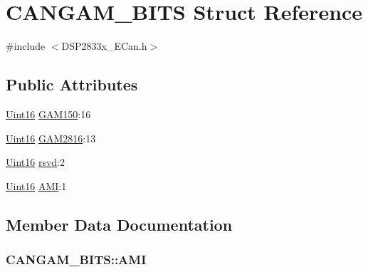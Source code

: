 \hypertarget{struct_c_a_n_g_a_m___b_i_t_s}{}\section{C\+A\+N\+G\+A\+M\+\_\+\+B\+I\+T\+S Struct Reference}
\label{struct_c_a_n_g_a_m___b_i_t_s}


{\ttfamily \#include $<$D\+S\+P2833x\+\_\+\+E\+Can.\+h$>$}

\subsection*{Public Attributes}
\begin{DoxyCompactItemize}
\item 
\hyperlink{_d_s_p2833x___device_8h_a59a9f6be4562c327cbfb4f7e8e18f08b}{Uint16} \hyperlink{struct_c_a_n_g_a_m___b_i_t_s_aa00a0d2413e29f6d399fcca7c89aaf15}{G\+A\+M150}\+:16
\item 
\hyperlink{_d_s_p2833x___device_8h_a59a9f6be4562c327cbfb4f7e8e18f08b}{Uint16} \hyperlink{struct_c_a_n_g_a_m___b_i_t_s_aaa0ef4eff24a2912c463cee73f9bfbc5}{G\+A\+M2816}\+:13
\item 
\hyperlink{_d_s_p2833x___device_8h_a59a9f6be4562c327cbfb4f7e8e18f08b}{Uint16} \hyperlink{struct_c_a_n_g_a_m___b_i_t_s_af2c1001cb07c240e4164ba773d163252}{rsvd}\+:2
\item 
\hyperlink{_d_s_p2833x___device_8h_a59a9f6be4562c327cbfb4f7e8e18f08b}{Uint16} \hyperlink{struct_c_a_n_g_a_m___b_i_t_s_a64602f616b7d4abf5b59ed8a014154d1}{A\+M\+I}\+:1
\end{DoxyCompactItemize}


\subsection{Member Data Documentation}
\hypertarget{struct_c_a_n_g_a_m___b_i_t_s_a64602f616b7d4abf5b59ed8a014154d1}{}
\subsubsection[{A\+M\+I}]{ C\+A\+N\+G\+A\+M\+\_\+\+B\+I\+T\+S\+::\+A\+M\+I}\label{struct_c_a_n_g_a_m___b_i_t_s_a64602f616b7d4abf5b59ed8a014154d1}
\hypertarget{struct_c_a_n_g_a_m___b_i_t_s_aa00a0d2413e29f6d399fcca7c89aaf15}{}
